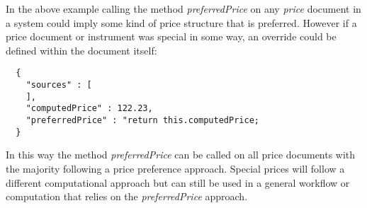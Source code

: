 In the above example calling the method \emph{preferredPrice} on any \emph{price} document in a \Rapture system could imply some kind of
price structure that is preferred. However if a price document or instrument was special in some way, an override could be defined within
the document itself:

\begin{lstlisting}
  {
    "sources" : [
    ],
    "computedPrice" : 122.23,
    "preferredPrice" : "return this.computedPrice;
  }
\end{lstlisting}

In this way the method \emph{preferredPrice} can be called on all price documents with the majority following a price preference approach. Special
prices will follow a different computational approach but can still be used in a general workflow or computation that relies on the \emph{preferredPrice} approach.
